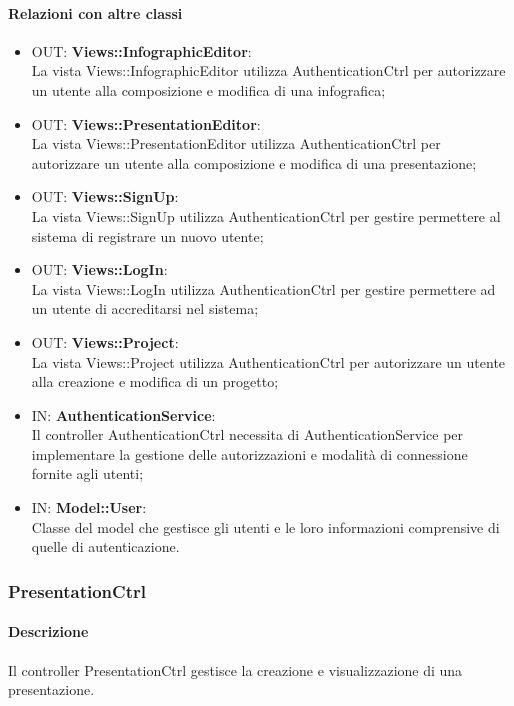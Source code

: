 	\paragraph{Relazioni con altre classi}
	\begin{itemize}
	  \item OUT: \textbf{Views::InfographicEditor}:\\
		La vista Views::InfographicEditor utilizza AuthenticationCtrl per autorizzare un utente alla composizione e modifica di una infografica;	
	  \item OUT: \textbf{Views::PresentationEditor}:\\
		La vista Views::PresentationEditor utilizza AuthenticationCtrl per autorizzare un utente alla composizione e modifica di una presentazione;
	  \item OUT: \textbf{Views::SignUp}:\\
		La vista Views::SignUp utilizza AuthenticationCtrl per gestire permettere al sistema di registrare un nuovo utente;
	  \item OUT: \textbf{Views::LogIn}:\\
	  	La vista Views::LogIn utilizza AuthenticationCtrl per gestire permettere ad un utente di accreditarsi nel sistema;
	  \item OUT: \textbf{Views::Project}:\\
	  	La vista Views::Project utilizza AuthenticationCtrl per autorizzare un utente alla creazione e modifica di un progetto;
	  \item IN: \textbf{AuthenticationService}:\\
	  	Il controller AuthenticationCtrl necessita di AuthenticationService per implementare la gestione delle autorizzazioni e modalità di connessione fornite agli utenti;	
	  	
	  \item IN: \textbf{Model::User}:\\
		Classe del model che gestisce gli utenti e le loro informazioni comprensive di quelle di autenticazione.
	\end{itemize}	
	
\newpage
\subsubsection{PresentationCtrl}
	\paragraph{Descrizione}
	Il controller PresentationCtrl gestisce la creazione e visualizzazione di una presentazione.
	
